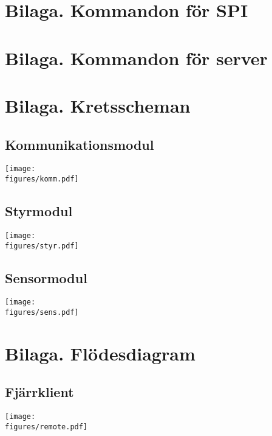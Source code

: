 \documentclass[main.tex]{subfiles}
\begin{document}
\pagestyle{empty}

\begin{appendices}
    \newpage
    \section{Bilaga. Kommandon för SPI}
    \label{bcmds}
    

    \newpage
    \section{Bilaga. Kommandon för server}
    \label{scmds}
    

    \begin{landscape}
    \section{Bilaga. Kretsscheman}
    
    \subsection{Kommunikationsmodul}
    \label{cdiag:comm}
	    \texttt{[image: \\figures/komm.pdf]}

    \subsection{Styrmodul}
    \label{cdiag:ctrl}
	    \texttt{[image: \\figures/styr.pdf]}

    \subsection{Sensormodul}
    \label{cdiag:sens}
	    \texttt{[image: \\figures/sens.pdf]}

    \section{Bilaga. Flödesdiagram}

    \subsection{Fjärrklient}
    \label{flow:remote}
	    \texttt{[image: \\figures/remote.pdf]}

    \end{landscape}
\end{appendices}
\end{document}
